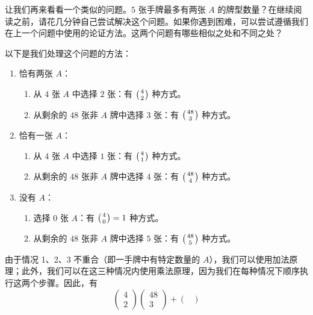 \begin{example}[最多两张 $A$]

    让我们再来看看一个类似的问题。$5$ 张手牌最多有两张 $A$ 的牌型数量？在继续阅读之前，请花几分钟自己尝试解决这个问题。如果你遇到困难，可以尝试遵循我们在上一个问题中使用的论证方法。这两个问题有哪些相似之处和不同之处？

    以下是我们处理这个问题的方法：
    \begin{enumerate}
        \item 恰有两张 $A$：
              \begin{enumerate}[label=(\alph*)]
                  \item 从 $4$ 张 $A$ 中选择 $2$ 张：有 $\big({4 \atop 2}\big)$ 种方式。
                  \item 从剩余的 $48$ 张非 $A$ 牌中选择 $3$ 张：有 $\big({48 \atop 3}\big)$ 种方式。
              \end{enumerate}
        \item 恰有一张 $A$：
              \begin{enumerate}[label=(\alph*)]
                  \item 从 $4$ 张 $A$ 中选择 $1$ 张：有 $\big({4 \atop 1}\big)$ 种方式。
                  \item 从剩余的 $48$ 张非 $A$ 牌中选择 $4$ 张：有 $\big({48 \atop 4}\big)$ 种方式。
              \end{enumerate}
        \item 没有 $A$：
              \begin{enumerate}[label=(\alph*)]
                  \item 选择 $0$ 张 $A$：有 $\big({4 \atop 0}\big)=1$ 种方式。
                  \item 从剩余的 $48$ 张非 $A$ 牌中选择 $5$ 张：有 $\big({48 \atop 5}\big)$ 种方式。
              \end{enumerate}
    \end{enumerate}
    由于情况 1、2、3 不重合（即一手牌中有特定数量的 $A$），我们可以使用加法原理；此外，我们可以在这三种情况内使用乘法原理，因为我们在每种情况下顺序执行这两个步骤。因此，有
    \[\begin{pmatrix}
            4 \\
            2
        \end{pmatrix}\begin{pmatrix}
            48 \\
            3
        \end{pmatrix}+\begin{pmatrix}

\end{pmatrix}\]
\end{example}
